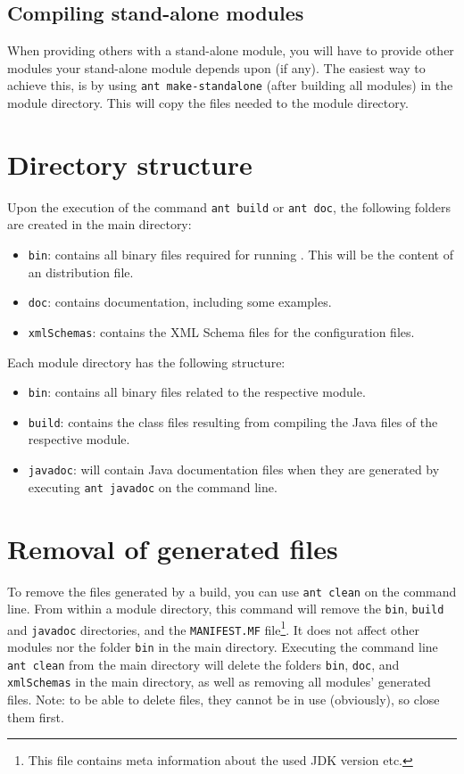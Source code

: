 \subsection{Compiling stand-alone modules}
When providing others with a stand-alone module, you will have to provide other modules your stand-alone module depends upon (if any). The easiest way to achieve this, is by using \verb|ant make-standalone| (after building all \oda modules) in the module directory. This will copy the files needed to the module directory.

\section{Directory structure}
Upon the execution of the command \verb|ant build| or \verb|ant doc|, the following folders are created in the main directory:

\begin{itemize}
\item \verb|bin|: contains all binary files required for running \oda. This will be the content of an \oda distribution file.
\item \verb|doc|: contains \oda documentation, including some examples.
\item \verb|xmlSchemas|: contains the XML Schema files for the \oda configuration files.
\end{itemize}

Each module directory has the following structure:

\begin{itemize}
\item \verb|bin|: contains all binary files related to the respective module.
\item \verb|build|: contains the class files resulting from compiling the Java files of the respective module.
\item \verb|javadoc|: will contain Java documentation files when they are generated by executing \verb|ant javadoc| on the command line.
\end{itemize}

\section{Removal of generated files}
To remove the files generated by a build, you can use \verb|ant clean| on the command line. From within a module directory, this command will remove the \verb|bin|, \verb|build| and \verb|javadoc| directories, and the \verb|MANIFEST.MF| file\footnote{This file contains meta information about the used JDK version etc.}. It does not affect other modules nor the folder \verb|bin| in the \oda main directory. Executing the command line \verb|ant clean| from the \oda main directory will delete the folders \verb|bin|, \verb|doc|, and \verb|xmlSchemas| in the main directory, as well as removing all modules' generated files. Note: to be able to delete files, they cannot be in use (obviously), so close them first.


